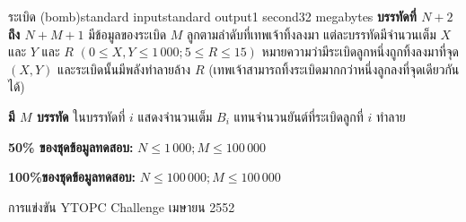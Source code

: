 \documentclass[11pt,a4paper]{article}
\begin{document}
\begin{problem}{ระเบิด (bomb)}{standard input}{standard output}{1 second}{32 megabytes}
\newpage
\textbf{บรรทัดที่ $N+2$ ถึง $N+M+1$} มีข้อมูลของระเบิด $M$ ลูกตามลำดับที่เทพเจ้าทิ้งลงมา แต่ละบรรทัดมีจำนวนเต็ม $X$ และ $Y$ และ $R$ $(0 \leq X, Y \leq 1\,000; 5 \leq R \leq 15)$ หมายความว่ามีระเบิดลูกหนึ่งถูกทิ้งลงมาที่จุด $(X, Y)$ และระเบิดนั้นมีพลังทำลายล้าง $R$ (เทพเจ้าสามารถทิ้งระเบิดมากกว่าหนึ่งลูกลงที่จุดเดียวกันได้)


\OutputFile

\textbf{มี $M$ บรรทัด }ในบรรทัดที่ $i$ แสดงจำนวนเต็ม $B_i$ แทนจำนวนยันต์ที่ระเบิดลูกที่ $i$ ทำลาย

\Examples

\begin{example}
%
%
\end{example}

\Scoring 

\textbf{50\% ของชุดข้อมูลทดสอบ:}  $N \leq 1\,000; M ≤ 100\,000$ 

\textbf{100\%ของชุดข้อมูลทดสอบ:} $N \leq 100\,000 ;M \leq 100\,000$

\Source

การแข่งขัน YTOPC Challenge เมษายน 2552


\end{problem}
\end{document}
